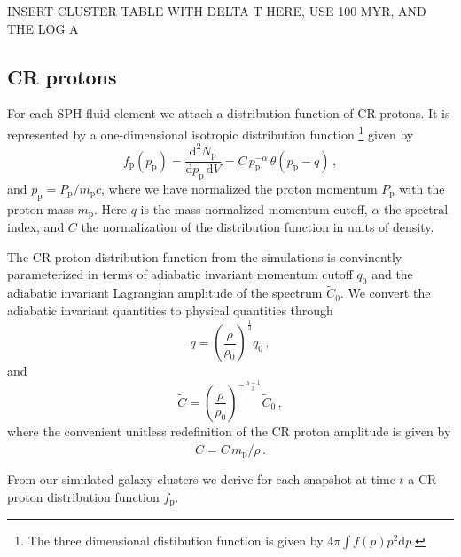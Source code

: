\documentclass[useAMS,usenatbib]{mn2e}
\def\del#1{{}}
\newcommand{\dd}{\mathrm{d}}
\newcommand{\p}{\mathrm{p}}
\begin{document}
INSERT CLUSTER TABLE WITH DELTA T HERE, USE 100 MYR, AND THE LOG A 

\subsection{CR protons}
For each SPH fluid element we attach a distribution function of CR protons. It is represented by a one-dimensional isotropic distribution function \footnote{The three dimensional distibution function is given by $4\pi \int f(p) p^ 2 \dd p$.} given by
\begin{equation}
  \label{eq:f_p}
  f_\p(p_\p) = \frac{\dd^2 N_\p}{\dd p_\p\,\dd V} = 
  C\, p_\p^{-\alpha}\,\theta(p_\p-q)\,, 
\end{equation}
and $p_\p = P_\p/m_\p c$, where we have normalized the proton momentum
$P_\p$ with the proton mass $m_\p$.  Here $q$ is the mass normalized
momentum cutoff, $\alpha$ the spectral index, and $C$ the
normalization of the distribution function in units of density. 

\del{From our simulated galaxy clusters we derive for each snapshot at time
$t$ the injected CR proton distribution function $f_\p$. We select
particles in the outskirts of clusters where the gas densities are low
and hence the Coulomb cooling of the CR protons small. }

The CR proton
distribution function from the simulations is convinently parameterized in terms of
adiabatic invariant momentum cutoff $q_0$ and the adiabatic invariant
Lagrangian amplitude of the spectrum $\tilde{C}_0$. We convert the adiabatic invariant quantities to physical quantities through
\begin{equation}
  \label{eq:q0}
  q=\left(\frac{\rho}{\rho_0}\right)^{\frac{1}{3}}q_0\,,
\end{equation}
and
\begin{equation}
  \label{eq:C0}
  \tilde{C}=\left(\frac{\rho}{\rho_0}\right)^{-\frac{\alpha-1}{3}}\tilde{C}_0\,,
\end{equation}
where the convenient unitless redefinition of the CR proton amplitude
is given by
\begin{equation}
  \label{eq:Ct}
  \tilde{C}=C\,m_\p/\rho\,.
\end{equation}

From our simulated galaxy clusters we derive for each snapshot at time
$t$ a CR proton distribution function $f_\p$. 

\del{We select
particles in the outskirts of clusters where the gas densities are low
and hence the Coulomb cooling of the CR protons small.}
\end{document}
